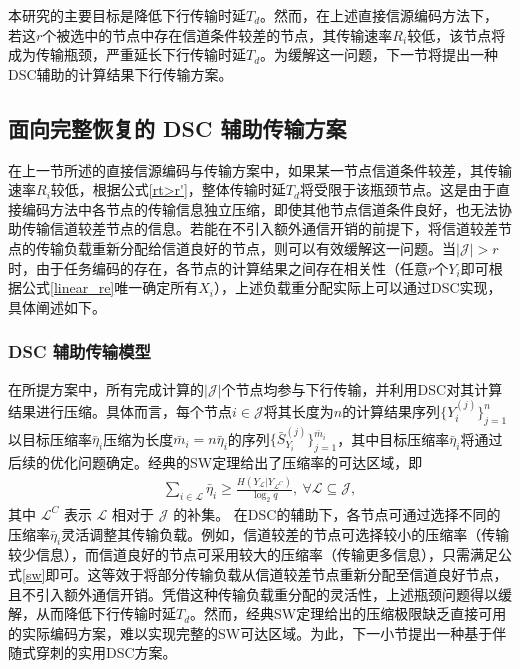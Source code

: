 本研究的主要目标是降低下行传输时延$T_d$。然而，在上述直接信源编码方法下，若这$r$个被选中的节点中存在信道条件较差的节点，其传输速率$R_i$较低，该节点将成为传输瓶颈，严重延长下行传输时延$T_d$。为缓解这一问题，下一节将提出一种DSC辅助的计算结果下行传输方案。


\subsection{面向完整恢复的 DSC 辅助传输方案}\label{3.2.3}
在上一节所述的直接信源编码与传输方案中，如果某一节点信道条件较差，其传输速率$R_i$较低，根据公式\eqref{rt>r'}，整体传输时延$T_d$将受限于该瓶颈节点。这是由于直接编码方法中各节点的传输信息独立压缩，即使其他节点信道条件良好，也无法协助传输信道较差节点的信息。若能在不引入额外通信开销的前提下，将信道较差节点的传输负载重新分配给信道良好的节点，则可以有效缓解这一问题。当$|\mathcal{J}|>r$时，由于任务编码的存在，各节点的计算结果之间存在相关性（任意$r$个$Y_i$即可根据公式\eqref{linear_re}唯一确定所有$X_i$），上述负载重分配实际上可以通过DSC实现，具体阐述如下。


\subsubsection{DSC 辅助传输模型}
在所提方案中，所有完成计算的$|\mathcal{J}|$个节点均参与下行传输，并利用DSC对其计算结果进行压缩。具体而言，每个节点$i\in\mathcal{J}$将其长度为$n$的计算结果序列$\{Y_i^{(j)}\}_{j=1}^n$以目标压缩率$\bar{\eta}_i$压缩为长度$\bar{m}_i=n\bar{\eta}_i$的序列$\{\bar{S}_{Y_i}^{(j)}\}_{j=1}^{\bar{m}_i}$，其中目标压缩率$\bar{\eta}_i$将通过后续的优化问题确定。经典的SW定理给出了压缩率的可达区域，即
\begin{align}
	\sum\nolimits_{i\in \mathcal{L}}\bar{\eta}_{i}\geq \frac{H(Y_{\mathcal{L}}|Y_{\mathcal{L}^C})}{\log_2q}, ~\forall \mathcal{L}\subseteq \mathcal{J},\label{sw}
\end{align}
其中 $\mathcal{L}^C$ 表示 $\mathcal{L}$ 相对于 $\mathcal{J}$ 的补集。
在DSC的辅助下，各节点可通过选择不同的压缩率$\bar{\eta}_i$灵活调整其传输负载。例如，信道较差的节点可选择较小的压缩率（传输较少信息），而信道良好的节点可采用较大的压缩率（传输更多信息），只需满足公式\eqref{sw}即可。这等效于将部分传输负载从信道较差节点重新分配至信道良好节点，且不引入额外通信开销。凭借这种传输负载重分配的灵活性，上述瓶颈问题得以缓解，从而降低下行传输时延$T_d$。然而，经典SW定理给出的压缩极限缺乏直接可用的实际编码方案，难以实现完整的SW可达区域。为此，下一小节提出一种基于伴随式穿刺的实用DSC方案。


